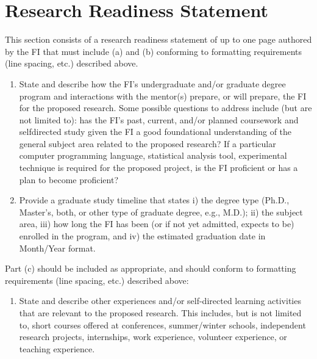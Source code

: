 \documentclass[
  letterpaper,
  DIV=11,
  numbers=noendperiod,
  oneside]{scrartcl}
\providecommand{\tightlist}{%
  \setlength{\itemsep}{0pt}\setlength{\parskip}{0pt}}\usepackage{longtable,booktabs,array}
\begin{document}
\section{Research Readiness
Statement}\label{research-readiness-statement}

\begin{tcolorbox}[enhanced jigsaw, breakable, colframe=quarto-callout-note-color-frame, colback=white, titlerule=0mm, left=2mm, leftrule=.75mm, opacitybacktitle=0.6, coltitle=black, title=\textcolor{quarto-callout-note-color}{\faInfo}\hspace{0.5em}{Note}, bottomtitle=1mm, toprule=.15mm, arc=.35mm, toptitle=1mm, rightrule=.15mm, opacityback=0, colbacktitle=quarto-callout-note-color!10!white, bottomrule=.15mm]

This section consists of a research readiness statement of up to one
page authored by the FI that must include (a) and (b) conforming to
formatting requirements (line spacing, etc.) described above.

\begin{enumerate}
\def\labelenumi{\alph{enumi}.}
\tightlist
\item
  State and describe how the FI's undergraduate and/or graduate degree
  program and interactions with the mentor(s) prepare, or will prepare,
  the FI for the proposed research. Some possible questions to address
  include (but are not limited to): has the FI's past, current, and/or
  planned coursework and selfdirected study given the FI a good
  foundational understanding of the general subject area related to the
  proposed research? If a particular computer programming language,
  statistical analysis tool, experimental technique is required for the
  proposed project, is the FI proficient or has a plan to become
  proficient?
\item
  Provide a graduate study timeline that states i) the degree type
  (Ph.D., Master's, both, or other type of graduate degree, e.g., M.D.);
  ii) the subject area, iii) how long the FI has been (or if not yet
  admitted, expects to be) enrolled in the program, and iv) the
  estimated graduation date in Month/Year format.
\end{enumerate}

Part (c) should be included as appropriate, and should conform to
formatting requirements (line spacing, etc.) described above:

\begin{enumerate}
\def\labelenumi{\alph{enumi}.}
\setcounter{enumi}{2}
\tightlist
\item
  State and describe other experiences and/or self-directed learning
  activities that are relevant to the proposed research. This includes,
  but is not limited to, short courses offered at conferences,
  summer/winter schools, independent research projects, internships,
  work experience, volunteer experience, or teaching experience.
\end{enumerate}

\end{tcolorbox}
\end{document}

